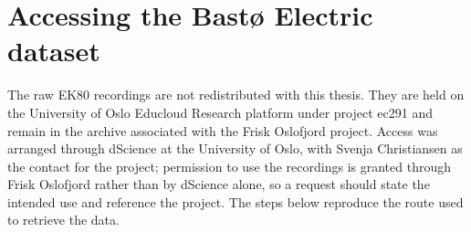 \begin{table}[htbp]
\centering
\caption{Dataset variant ablation, trained on the Jan-2024 subset for computational reasons. Baseline: min-max $[0,1]$ normalisation, 3-channel input, ``below'' mask mode. Each variant changes one parameter.}
\label{tab:datasets}
\small
{}
\end{table}




\chapter{Accessing the Bast\o{} Electric dataset}
\label{app:data-access}

The raw EK80 recordings are not redistributed with this thesis. They are held on the University of Oslo Educloud Research platform under project ec291 and remain in the archive associated with the Frisk Oslofjord project. Access was arranged through dScience at the University of Oslo, with Svenja Christiansen as the contact for the project; permission to use the recordings is granted through Frisk Oslofjord rather than by dScience alone, so a request should state the intended use and reference the project. The steps below reproduce the route used to retrieve the data.

